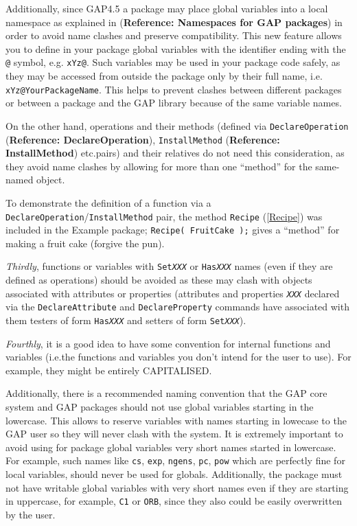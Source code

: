 \documentclass[a4paper,11pt]{report}
\begin{document}
{{  Additionally, since \textsf{GAP}{\nobreakspace}4.5 a package may place global variables into a local namespace
as explained in  (\textbf{Reference: Namespaces for GAP packages}) in order to avoid name clashes and preserve compatibility. This new feature
allows you to define in your package global variables with the identifier
ending with the \texttt{@} symbol, e.g. \texttt{xYz@}. Such variables may be used in your package code safely, as they may be
accessed from outside the package only by their full name, i.e. \texttt{xYz@YourPackageName}. This helps to prevent clashes between different packages or between a
package and the \textsf{GAP} library because of the same variable names.  

 On the other hand, operations and their methods (defined via \texttt{DeclareOperation} (\textbf{Reference: DeclareOperation}), \texttt{InstallMethod} (\textbf{Reference: InstallMethod}) etc.{\nobreakspace}pairs) and their relatives do not need this consideration,
as they avoid name clashes by allowing for more than one ``method'' for the same-named object. 

 To demonstrate the definition of a function via a \texttt{DeclareOperation}/\texttt{InstallMethod} pair, the method \texttt{Recipe} (\ref{Recipe}) was included in the \textsf{Example} package; \texttt{Recipe( FruitCake );} gives a ``method'' for making a fruit cake (forgive the pun). 

 \emph{Thirdly}, functions or variables with \texttt{Set\mbox{\texttt{\mdseries\slshape XXX}}} or \texttt{Has\mbox{\texttt{\mdseries\slshape XXX}}} names (even if they are defined as operations) should be avoided as these may
clash with objects associated with attributes or properties (attributes and
properties \mbox{\texttt{\mdseries\slshape XXX}} declared via the \texttt{DeclareAttribute} and \texttt{DeclareProperty} commands have associated with them testers of form \texttt{Has\mbox{\texttt{\mdseries\slshape XXX}}} and setters of form \texttt{Set\mbox{\texttt{\mdseries\slshape XXX}}}). 

 \emph{Fourthly}, it is a good idea to have some convention for internal functions and
variables (i.e.{\nobreakspace}the functions and variables you don't intend for
the user to use). For example, they might be entirely CAPITALISED. 

 Additionally, there is a recommended naming convention that the \textsf{GAP} core system and \textsf{GAP} packages should not use global variables starting in the lowercase. This
allows to reserve variables with names starting in lowecase to the \textsf{GAP} user so they will never clash with the system. It is extremely important to
avoid using for package global variables very short names started in
lowercase. For example, such names like \texttt{cs}, \texttt{exp}, \texttt{ngens}, \texttt{pc}, \texttt{pow} which are perfectly fine for local variables, should never be used for
globals. Additionally, the package must not have writable global variables
with very short names even if they are starting in uppercase, for example, \texttt{C1} or \texttt{ORB}, since they also could be easily overwritten by the user. 

}}
\end{document}
